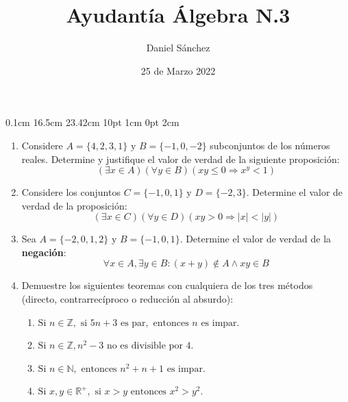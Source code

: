 \documentclass[12pt]{article}
\begin{document}
\setmargins{2.5cm}
{0.1cm}
{16.5cm}
{23.42cm}
{10pt}
{1cm}
{0pt}
{2cm}

\title{Ayudant\'ia \'Algebra N.3}
\date{25 de Marzo 2022}
\author{Daniel S\'anchez}
\maketitle

\begin{enumerate}
    \item Considere $A=\{4,2,3,1\} \mbox{ y } B=\{-1,0,-2\}$ subconjuntos de los n\'umeros reales. Determine y justifique
          el valor de verdad de la siguiente proposici\'on:
          $$(\exists x \in A)(\forall y \in B)(xy\leq 0 \Rightarrow x^{y}<1)$$
    \item Considere los conjuntos $C=\{-1,0,1\} \mbox{ y } D=\{-2,3\}$. Determine el valor de verdad de la proposici\'on:
          $$(\exists x \in C)(\forall y \in D)(xy>0 \Rightarrow |x|<|y|)$$
    \item Sea $A=\{-2,0,1,2\} \mbox{ y } B=\{-1,0,1\}$. Determine el valor de verdad de la \textbf{negaci\'on}:
          $$\forall x \in A, \exists y \in B : (x+y) \notin A \land xy\in B$$
    \item Demuestre los siguientes teoremas con cualquiera de los tres m\'etodos (directo, contrarrec\'iproco o reducci\'on al absurdo):
          \begin{enumerate}
              \item $\mbox{Si } n \in \mathbb{Z}, \mbox{ si } 5n+3 \mbox{ es par}, \mbox{ entonces } n \mbox{ es impar}$.
              \item $\mbox{Si } n \in \mathbb{Z}, n^2-3 \mbox{ no es divisible por }4$.
              \item $\mbox{Si } n \in \mathbb{N}, \mbox{ entonces } n^2+n+1 \mbox{ es impar}$.
              \item $\mbox{Si }x,y \in \mathbb{R^+}, \mbox{ si } x>y \mbox{ entonces } x^2>y^2$.
          \end{enumerate}
\end{enumerate}
\end{document}
